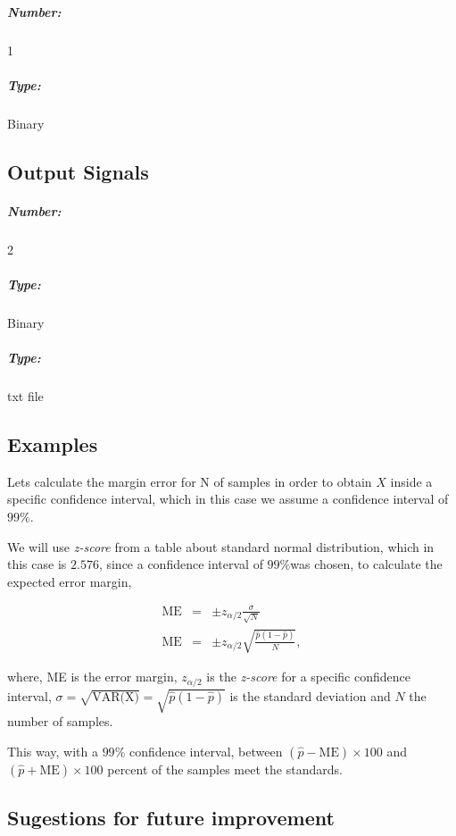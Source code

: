 \subparagraph*{Number:} 1

\subparagraph*{Type:} Binary

\subsection*{Output Signals}

\subparagraph*{Number:} 2

\subparagraph*{Type:} Binary
\subparagraph*{Type:} txt file

\subsection*{Examples}


Lets calculate the margin error for N of samples in order to obtain $X$ inside a specific confidence interval, which in this case we assume a confidence interval of $99\%$.

We will use \textit{z-score } from a table about standard normal distribution, which in this case is $2.576$, since a confidence interval of $99\%$was chosen, to calculate the expected error margin,

\begin{eqnarray}
  \nonumber %
  \textrm{ME} &=&  \pm z_{\alpha/2}\frac{\sigma}{\sqrt{N}} \\
  \textrm{ME} &=& \pm z_{\alpha/2}\sqrt{\frac{\hat{p}(1-\hat{p})}{N}},
\end{eqnarray}

where, \textrm{ME} is the error margin, $z_{\alpha/2}$ is the \textit{z-score} for a specific confidence interval, $\sigma = \sqrt{\textrm{VAR(X})} = \sqrt{\hat{p}(1-\hat{p})}$ is the standard deviation and $N$ the number of samples.

This way, with a $99\%$ confidence interval, between $(\hat{p}-\textrm{ME}) \times 100$  and $(\hat{p}+\textrm{ME}) \times 100$ percent of the samples meet the standards.



\subsection*{Sugestions for future improvement}




